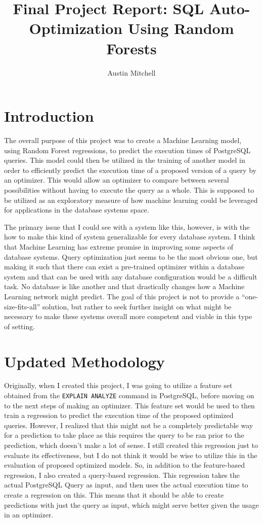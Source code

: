 \documentclass[sigconf]{acmart}
\title{Final Project Report: SQL Auto-Optimization Using Random Forests}
\author{Austin Mitchell}
\affiliation{%
  \institution{Georgia Institute of Technology}
  \city{Atlanta, GA}
  \country{United States}
}
\begin{document}
\maketitle

\section{Introduction}
The overall purpose of this project was to create a Machine Learning model, using Random Forest regressions, to predict the execution times of PostgreSQL
queries. This model could then be utilized in the training of another model in order to efficiently predict the execution time of a proposed version of a query
by an optimizer. This would allow an optimizer to compare between several possibilities without having to execute the query as a whole. This is supposed to be
utilized as an exploratory measure of how machine learning could be leveraged for applications in the database systems space.

The primary issue that I could see with a system like this, however, is with the how to make this kind of system generalizable for every database system.
I think that Machine Learning has extreme promise in improving some aspects of database systems. Query optimization just seems to be the most obvious one, but
making it such that there can exist a pre-trained optimizer within a database system and that can be used with any database configuration would be a difficult task.
No database is like another and that drastically changes how a Machine Learning network might predict. The goal of this project is not to provide a ``one-size-fits-all'' solution,
but rather to seek further insight on what might be necessary to make these systems overall more competent and viable in this type of setting.

\section{Updated Methodology}
Originally, when I created this project, I was going to utilize a feature set obtained from the \texttt{EXPLAIN ANALYZE} command in PostgreSQL, 
before moving on to the next steps of making an optimizer. This feature set would be used to then train a regression to predict the execution time 
of the proposed optimized queries. However, I realized that this might not be a completely predictable way for a prediction to take place as this requires
the query to be ran prior to the prediction, which doesn't make a lot of sense. I still created this regression just to evaluate its effectiveness, but I do
not think it would be wise to utilize this in the evaluation of proposed optimized models. So, in addition to the feature-based regression, I also created
a query-based regression. This regression takes the actual PostgreSQL Query as input, and then uses the actual execution time to create a regression on this.
This means that it should be able to create predictions with just the query as input, which might serve better given the usage in an optimizer.
\end{document}
